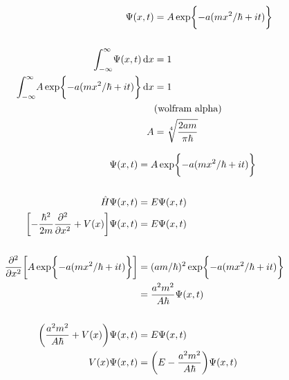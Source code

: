 \documentclass[12pt]{article}
\begin{document}
\problemasub

\begin{align*}
\Psi(x,t) &= A \exp\biggl\{-a (mx^2/\hbar + it) \biggr\} \\
\\
\int_{-\infty}^{\infty} \! \Psi(x,t) \, \mathrm{d} x &= 1 \\
\int_{-\infty}^{\infty} \! A\exp\biggl\{-a (mx^2/\hbar + it) \biggr\} \, \mathrm{d} x &= 1 \\
&\text{(wolfram alpha)} \\
A &= \sqrt[4]{\frac{2am}{\pi \hbar}}
\end{align*}

\newpage
\problemasub

\begin{align*}
\Psi(x,t) &= A \exp\biggl\{-a (mx^2/\hbar + it) \biggr\} \\
\\
\hat{H}\Psi(x, t) &= E \Psi(x, t) \\
\biggl[-\frac{\hbar^2}{2m} \frac{\partial^2}{\partial x^2} + V(x)\biggr]\Psi(x, t) &= E \Psi(x, t) \\
\\
\frac{\partial^2}{\partial x^2} \biggl[ A \exp\biggl\{-a (mx^2/\hbar + it) \biggr\} \biggr] &= (am/\hbar)^2 \exp\biggl\{-a (mx^2/\hbar + it) \biggr\} \\ 
&= \frac{a^2m^2}{A\hbar} \Psi(x,t) \\
\\
\biggl(\frac{a^2m^2}{A\hbar} + V(x) \biggr) \Psi(x,t) &= E \Psi(x,t) \\
V(x)\Psi(x,t) &= \biggl(E - \frac{a^2m^2}{A\hbar}\biggr)\Psi(x,t)
\end{align*}
\end{document}
